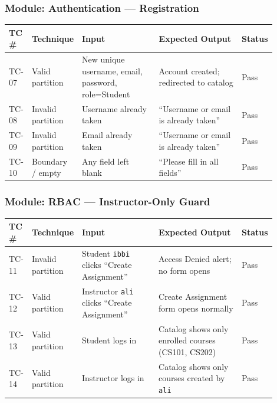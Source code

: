 \documentclass[12pt, a4paper]{article}
\begin{document}
\subsubsection*{Module: Authentication --- Registration}
\begin{center}\small
\begin{tabular}{@{}p{0.06\linewidth}p{0.13\linewidth}p{0.30\linewidth}p{0.33\linewidth}p{0.08\linewidth}@{}}
  \toprule
  \textbf{TC \#} & \textbf{Technique} & \textbf{Input} & \textbf{Expected Output} & \textbf{Status} \\
  \midrule
  TC-07 & Valid partition   & New unique username, email, password, role=Student & Account created; redirected to catalog       & \textcolor{success}{Pass} \\
  TC-08 & Invalid partition & Username already taken                            & ``Username or email is already taken''        & \textcolor{success}{Pass} \\
  TC-09 & Invalid partition & Email already taken                                & ``Username or email is already taken''        & \textcolor{success}{Pass} \\
  TC-10 & Boundary / empty  & Any field left blank                               & ``Please fill in all fields''                 & \textcolor{success}{Pass} \\
  \bottomrule
\end{tabular}
\end{center}

\subsubsection*{Module: RBAC --- Instructor-Only Guard}
\begin{center}\small
\begin{tabular}{@{}p{0.06\linewidth}p{0.13\linewidth}p{0.30\linewidth}p{0.33\linewidth}p{0.08\linewidth}@{}}
  \toprule
  \textbf{TC \#} & \textbf{Technique} & \textbf{Input} & \textbf{Expected Output} & \textbf{Status} \\
  \midrule
  TC-11 & Invalid partition & Student \texttt{ibbi} clicks ``Create Assignment'' & Access Denied alert; no form opens          & \textcolor{success}{Pass} \\
  TC-12 & Valid partition   & Instructor \texttt{ali} clicks ``Create Assignment'' & Create Assignment form opens normally       & \textcolor{success}{Pass} \\
  TC-13 & Valid partition   & Student logs in                                  & Catalog shows only enrolled courses (CS101, CS202) & \textcolor{success}{Pass} \\
  TC-14 & Valid partition   & Instructor logs in                               & Catalog shows only courses created by \texttt{ali}   & \textcolor{success}{Pass} \\
  \bottomrule
\end{tabular}
\end{center}
\end{document}
